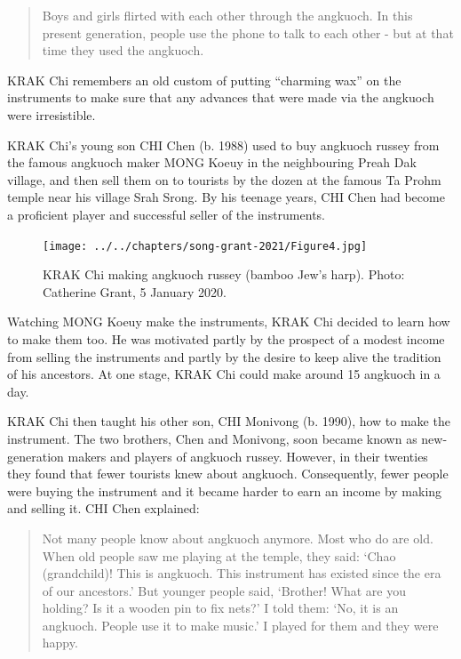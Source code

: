 \documentclass[twoside]{article}
\begin{document}
\begin{quote}
Boys and girls flirted with each other through the angkuoch. In this
present generation, people use the phone to talk to each other - but at
that time they used the angkuoch.
\end{quote}

KRAK Chi remembers an old custom of putting ``charming wax'' on the
instruments to make sure that any advances that were made via the
angkuoch were irresistible.

KRAK Chi's young son CHI Chen (b. 1988) used to buy angkuoch russey from
the famous angkuoch maker MONG Koeuy in the neighbouring Preah Dak
village, and then sell them on to tourists by the dozen at the famous Ta
Prohm temple near his village Srah Srong. By his teenage years, CHI Chen
had become a proficient player and successful seller of the instruments.

\begin{figure}
  \texttt{[image: ../../chapters/song-grant-2021/Figure4.jpg]}
  \caption{KRAK Chi making angkuoch russey (bamboo Jew's harp). Photo: Catherine Grant, 5 January 2020.}
\end{figure}

Watching MONG Koeuy make the instruments, KRAK Chi decided to learn how
to make them too. He was motivated partly by the prospect of a modest
income from selling the instruments and partly by the desire to keep
alive the tradition of his ancestors. At one stage, KRAK Chi could make
around 15 angkuoch in a day.

KRAK Chi then taught his other son, CHI Monivong (b. 1990), how to make
the instrument. The two brothers, Chen and Monivong, soon became known
as new-generation makers and players of angkuoch russey. However, in
their twenties they found that fewer tourists knew about angkuoch.
Consequently, fewer people were buying the instrument and it became
harder to earn an income by making and selling it. CHI Chen explained:

\begin{quote}
Not many people know about angkuoch anymore. Most who do are old. When​
old people saw me playing at the temple, they said: `Chao (grandchild)!
This is angkuoch. This instrument has existed since the era of our
ancestors.' But younger people said, `Brother! What are you holding? Is
it a wooden pin to fix nets?' I told them: `No, it is an angkuoch.
People use it to make music.' I played for them and they were happy.
\end{quote}
\end{document}
